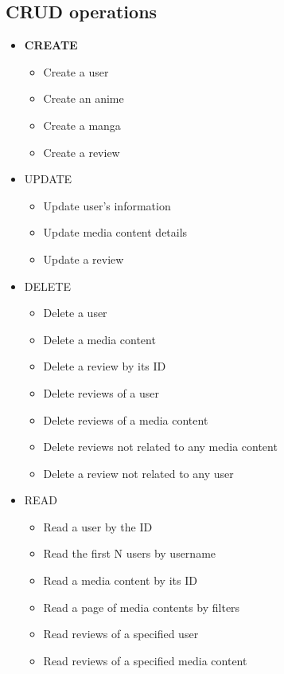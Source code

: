 \subsection*{CRUD operations}
\begin{itemize}
  \item \textbf{CREATE}
  \begin{itemize}
      \item Create a user
      \item Create an anime
      \item Create a manga
      \item Create a review
  \end{itemize}

  \item{UPDATE}
  \begin{itemize}
      \item Update user's information
      \item Update media content details
      \item Update a review
  \end{itemize}

  \item{DELETE}
  \begin{itemize}
      \item Delete a user
      \item Delete a media content
      \item Delete a review by its ID
      \item Delete reviews of a user
      \item Delete reviews of a media content
      \item Delete reviews not related to any media content
      \item Delete a review not related to any user
  \end{itemize}

  \item{READ}
  \begin{itemize}
      \item Read a user by the ID
      \item Read the first N users by username
      \item Read a media content by its ID
      \item Read a page of media contents by filters
      \item Read reviews of a specified user
      \item Read reviews of a specified media content
  \end{itemize}
\end{itemize}

